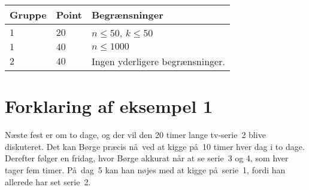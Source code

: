 \noindent
\begin{tabular}{| l | l | l |}
\hline
Gruppe & Point & Begrænsninger \\ \hline
$1$   & $20$       & $n \leq 50$, $k \leq 50$ \\ \hline
$1$   & $40$       & $n \leq 1000$ \\ \hline
$2$   & $40$       & Ingen yderligere begrænsninger. \\ \hline
\end{tabular}

\section*{Forklaring af eksempel 1}
Næste fest er om to dage, og der vil den 20 timer lange tv-serie~2 blive diskuteret.
Det kan Børge præcis nå ved at kigge på 10 timer hver dag i to dage.
Derefter følger en fridag, hvor Børge akkurat når at se serie~3 og 4, som hver tager fem timer.
På dag~5 kan han nøjes med at kigge på serie~1, fordi han allerede har set serie~2.
